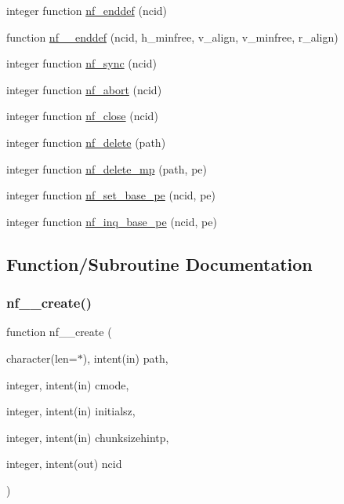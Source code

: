 \begin{DoxyCompactItemize}
integer function \hyperlink{nf__control_8F90_a89fd8e80dbeb15cd4d31e6ef638022bc}{nf\+\_\+enddef} (ncid)
\item 
function \hyperlink{nf__control_8F90_a1db64050c9f96c2b53d8c18e13d6ad10}{nf\+\_\+\+\_\+enddef} (ncid, h\+\_\+minfree, v\+\_\+align, v\+\_\+minfree, r\+\_\+align)
\item 
integer function \hyperlink{nf__control_8F90_ad8cafefd0124b15508206b09f6c85f3e}{nf\+\_\+sync} (ncid)
\item 
integer function \hyperlink{nf__control_8F90_adb314a3785bb1f9c74796c4d433734b5}{nf\+\_\+abort} (ncid)
\item 
integer function \hyperlink{nf__control_8F90_a0b56f2b46ddbb26498d532776af44fd0}{nf\+\_\+close} (ncid)
\item 
integer function \hyperlink{nf__control_8F90_aa8ac9a1fb64e51a1ca98b3871df9d3f9}{nf\+\_\+delete} (path)
\item 
integer function \hyperlink{nf__control_8F90_a7731f60779d4069c3098477bc964a292}{nf\+\_\+delete\+\_\+mp} (path, pe)
\item 
integer function \hyperlink{nf__control_8F90_a7cb25d69c557c8a6c0ce04c298113d3f}{nf\+\_\+set\+\_\+base\+\_\+pe} (ncid, pe)
\item 
integer function \hyperlink{nf__control_8F90_a1405b5aed252a4c5bf44fef21c5cdb3a}{nf\+\_\+inq\+\_\+base\+\_\+pe} (ncid, pe)
\end{DoxyCompactItemize}


\subsection{Function/\+Subroutine Documentation}
\mbox{\label{nf__control_8F90_a91bc14c4db237811056c641a0ee44636}} 
\subsubsection{\texorpdfstring{nf\+\_\+\+\_\+create()}{nf\_\_create()}}
{\footnotesize\ttfamily function nf\+\_\+\+\_\+create (\begin{DoxyParamCaption}\item[{character(len=$\ast$), intent(in)}]{path,  }\item[{integer, intent(in)}]{cmode,  }\item[{integer, intent(in)}]{initialsz,  }\item[{integer, intent(in)}]{chunksizehintp,  }\item[{integer, intent(out)}]{ncid }\end{DoxyParamCaption})}



